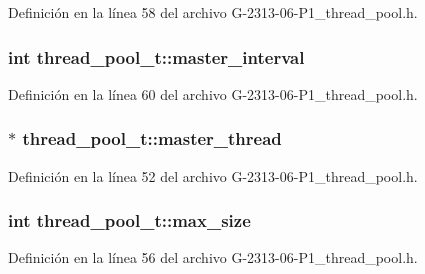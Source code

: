Definición en la línea 58 del archivo G-\/2313-\/06-\/\+P1\+\_\+thread\+\_\+pool.\+h.

\hypertarget{structthread__pool__t_ae3eaf8d90ef550166e595286a6175d14}{}
\subsubsection[{master\+\_\+interval}]{\setlength{\rightskip}{0pt plus 5cm}int thread\+\_\+pool\+\_\+t\+::master\+\_\+interval}\label{structthread__pool__t_ae3eaf8d90ef550166e595286a6175d14}


Definición en la línea 60 del archivo G-\/2313-\/06-\/\+P1\+\_\+thread\+\_\+pool.\+h.

\hypertarget{structthread__pool__t_a9ad8218717dde39eef701a8bce5ca0a1}{}
\subsubsection[{master\+\_\+thread}]{$\ast$ thread\+\_\+pool\+\_\+t\+::master\+\_\+thread}\label{structthread__pool__t_a9ad8218717dde39eef701a8bce5ca0a1}


Definición en la línea 52 del archivo G-\/2313-\/06-\/\+P1\+\_\+thread\+\_\+pool.\+h.

\hypertarget{structthread__pool__t_a978e7f94032dad6e7a373e7bc1896237}{}
\subsubsection[{max\+\_\+size}]{\setlength{\rightskip}{0pt plus 5cm}int thread\+\_\+pool\+\_\+t\+::max\+\_\+size}\label{structthread__pool__t_a978e7f94032dad6e7a373e7bc1896237}


Definición en la línea 56 del archivo G-\/2313-\/06-\/\+P1\+\_\+thread\+\_\+pool.\+h.

\hypertarget{structthread__pool__t_a80aa1805a11e2e6e2bf5811fda0ffc26}{}
